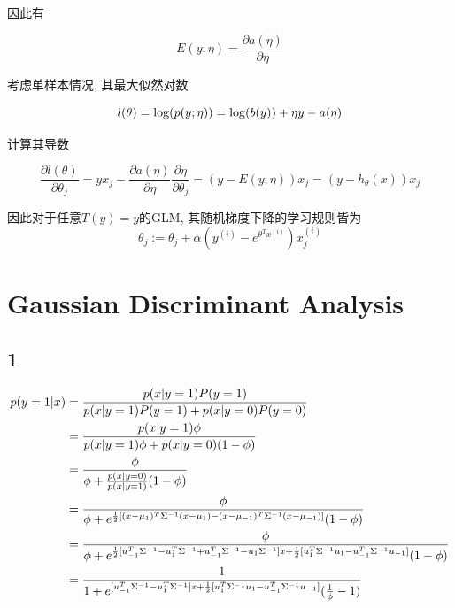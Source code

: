 \documentclass{ctexart}
\begin{document}
因此有

\begin{equation}
	E(y;\eta) = \frac{\partial a(\eta)}{\partial \eta}
\end{equation}

考虑单样本情况, 其最大似然对数

\begin{equation}
	l(\theta) = \log(p(y;\eta)) = \log(b(y)) + \eta y - a(\eta) \notag
\end{equation}

计算其导数

\begin{equation}
\frac{\partial l(\theta)}{\partial \theta_j} = yx_j - \frac{\partial a(\eta)}{\partial \eta} \frac{\partial \eta}{\partial \theta_j} = (y - E(y;\eta))x_j = (y-h_\theta(x))x_j
\end{equation}

因此对于任意$T(y) = y$的GLM, 其随机梯度下降的学习规则皆为
\begin{equation}
\theta_j:= \theta_j + \alpha(y^{(i)} - e^{\theta^Tx^{(i)}})x_j^{(i)}
\end{equation}

\section{Gaussian Discriminant Analysis}

\subsection{1}

\begin{align}
	p(y = 1|x) &= \frac{p(x|y = 1)P(y = 1)}{p(x|y = 1)P(y = 1) + p(x|y = 0)P(y = 0)} \notag \\
	&=  \frac{p(x|y = 1)\phi}{p(x|y = 1)\phi + p(x|y = 0)(1 - \phi)} \notag \\
	&=  \frac{\phi}{\phi + \frac{p(x|y = 0)}{p(x|y = 1)}(1 - \phi)} \notag \\
	&=  \frac{\phi}{\phi + e^{\frac{1}{2}[(x-\mu_1)^T\Sigma^{-1}(x-\mu_1)-(x-\mu_{-1})^T\Sigma^{-1}(x-\mu_{-1})]}(1 - \phi)} \notag \\
	&= \frac{\phi}{\phi + e^{\frac{1}{2}[u_{-1}^T\Sigma^{-1}-u_1^T\Sigma^{-1} + u_{-1}^T \Sigma^{-1} - u_1 \Sigma^{-1}]x + \frac{1}{2}[u_1^T\Sigma^{-1}u_1 - u_{-1}^T\Sigma^{-1}u_{-1}]}(1 - \phi)} \notag \\
	&= \frac{1}{1 + e^{[u_{-1}^T\Sigma^{-1}-u_1^T\Sigma^{-1}]x + \frac{1}{2}[u_1^T\Sigma^{-1}u_1 - u_{-1}^T\Sigma^{-1}u_{-1}]}(\frac{1}{\phi} - 1)} \notag \\
\end{align}
\end{document}
